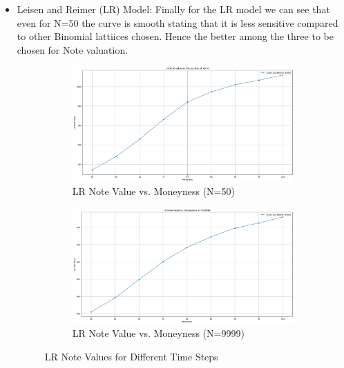 \documentclass[12pt,a4paper]{article}
\begin{document}
\begin{itemize}
\item Leisen and Reimer (LR) Model:
Finally for the LR model we can see that even for N=50 the curve is smooth stating that it is less sensitive compared to other Binomial lattiices chosen. Hence the better among the three to be chosen for Note valuation.
\begin{figure}[htbp]
    \centering
    \begin{subfigure}[b]{0.48\textwidth}
        \centering
        \includegraphics[width=\textwidth]{Images/sen_lr_50.png}
        \caption{LR Note Value vs. Moneyness (N=50)}
        \label{fig:crr_n50}
    \end{subfigure}
    \hfill
    \begin{subfigure}[b]{0.48\textwidth}
        \centering
        \includegraphics[width=\textwidth]{Images/sen_lr.png}
        \caption{LR Note Value vs. Moneyness (N=9999)}
        \label{fig:crr_n9999}
    \end{subfigure}
    \caption{LR Note Values for Different Time Steps}
    \label{fig:crr_comparison}
\end{figure}
\end{itemize}
\end{document}
